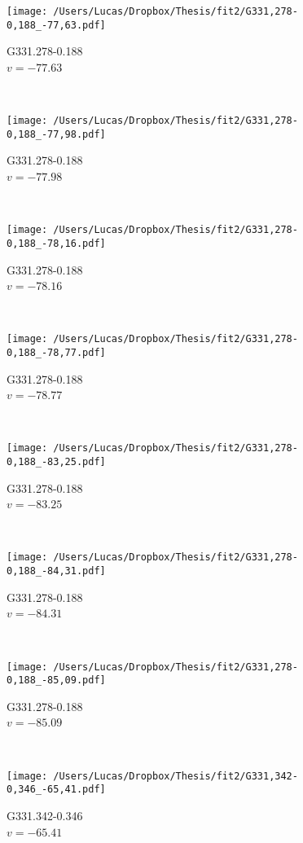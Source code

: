 \begin{figure*}[t]\ContinuedFloat
	\centering
	\begin{subfigure}[t]{0.3\textwidth}
		\texttt{[image: /Users/Lucas/Dropbox/Thesis/fit2/G331,278-0,188\_-77,63.pdf]}
		\caption[]{G331.278-0.188\\$v=-77.63$\,\kms}
	\end{subfigure}
	~
	\begin{subfigure}[t]{0.3\textwidth}
		\texttt{[image: /Users/Lucas/Dropbox/Thesis/fit2/G331,278-0,188\_-77,98.pdf]}
		\caption[]{G331.278-0.188\\$v=-77.98$\,\kms}
	\end{subfigure}
	~
	\begin{subfigure}[t]{0.3\textwidth}
		\texttt{[image: /Users/Lucas/Dropbox/Thesis/fit2/G331,278-0,188\_-78,16.pdf]}
		\caption[]{G331.278-0.188\\$v=-78.16$\,\kms}
	\end{subfigure}
	~
	\begin{subfigure}[t]{0.3\textwidth}
		\texttt{[image: /Users/Lucas/Dropbox/Thesis/fit2/G331,278-0,188\_-78,77.pdf]}
		\caption[]{G331.278-0.188\\$v=-78.77$\,\kms}
	\end{subfigure}
	~
	\begin{subfigure}[t]{0.3\textwidth}
		\texttt{[image: /Users/Lucas/Dropbox/Thesis/fit2/G331,278-0,188\_-83,25.pdf]}
		\caption[]{G331.278-0.188\\$v=-83.25$\,\kms}
	\end{subfigure}
	~
	\begin{subfigure}[t]{0.3\textwidth}
		\texttt{[image: /Users/Lucas/Dropbox/Thesis/fit2/G331,278-0,188\_-84,31.pdf]}
		\caption[]{G331.278-0.188\\$v=-84.31$\,\kms}
	\end{subfigure}
	~
	\begin{subfigure}[t]{0.3\textwidth}
		\texttt{[image: /Users/Lucas/Dropbox/Thesis/fit2/G331,278-0,188\_-85,09.pdf]}
		\caption[]{G331.278-0.188\\$v=-85.09$\,\kms}
	\end{subfigure}
	~
	\begin{subfigure}[t]{0.3\textwidth}
		\texttt{[image: /Users/Lucas/Dropbox/Thesis/fit2/G331,342-0,346\_-65,41.pdf]}
		\caption[]{G331.342-0.346\\$v=-65.41$\,\kms}

\end{subfigure}
\end{figure*}
